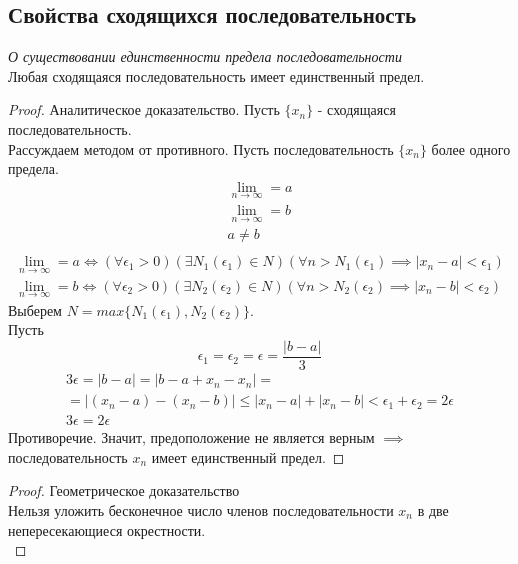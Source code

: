 \subsection{Свойства сходящихся последовательность}

\begin{theorem}
  \textit{О существовании единственности предела последовательности} \\
  Любая сходящаяся последовательность имеет единственный предел.
\end{theorem}
\begin{proof} Аналитическое доказательство.
  Пусть $\{x_{n}\} $ - сходящаяся последовательность. \\
  Рассуждаем методом от противного. Пусть последовательность $\{x_{n}\} $ более одного предела.
  \begin{gather*}
    \lim_{n \to \infty} = a \\
    \lim_{n \to \infty} = b \\
    a \neq b \\
  \end{gather*}
  \begin{gather}
    \lim_{n \to \infty} = a \iff (\forall \epsilon_1 > 0)(\exists N_1(\epsilon_1) \in N)(\forall n > N_1(\epsilon_1) \implies |x_{n} - a| < \epsilon_1) \\
    \lim_{n \to \infty} = b \iff (\forall \epsilon_2 > 0)(\exists N_2(\epsilon_2) \in N)(\forall n > N_2(\epsilon_2) \implies |x_{n} - b| < \epsilon_2)  
  \end{gather} 
  Выберем $N=max \{N_1\left( \epsilon_1 \right) , N_2\left( \epsilon_2 \right) \}$. \\
  Пусть 
  \[
    \epsilon_1 = \epsilon_2 = \epsilon = \frac{|b - a|}{3}
  \]
  \begin{gather*}
  3 \epsilon = |b - a| = |b - a + x_{n} - x_{n}| = \\
  = |(x_{n} - a) - (x_{n} - b)| \le |x_{n} - a| + |x_{n} - b| < \epsilon_1 + \epsilon_2 = 2 \epsilon \\
  3 \epsilon = 2 \epsilon
  \end{gather*}
  Противоречие. Значит, предоположение не является верным $\implies$ последовательность $x_{n}$ имеет единственный предел.
\end{proof}

\begin{proof} Геометрическое доказательство\\
  Нельзя уложить бесконечное число членов последовательности $x_{n}$ в две непересекающиеся окрестности. \\
\end{proof}

